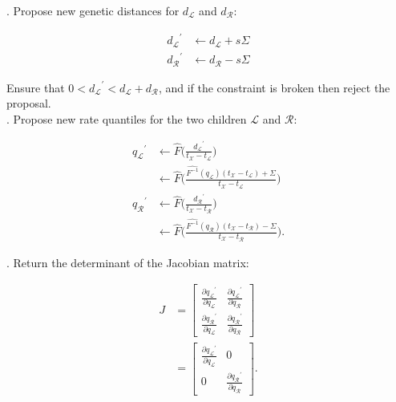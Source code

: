 \documentclass[12pt]{article}
\begin{document}
. Propose new genetic distances for $d_\mathcal{L}$ and $d_\mathcal{R}$:

\begin{align}
	{d_\mathcal{L}}^\prime & \leftarrow d_\mathcal{L} + s\Sigma \\
	{d_\mathcal{R}}^\prime & \leftarrow d_\mathcal{R} - s\Sigma
\end{align}


Ensure that $0 < {d_\mathcal{L}}^\prime < d_\mathcal{L} + d_\mathcal{R}$, and if the constraint is broken then reject the proposal.  \\




. Propose new rate quantiles for the two children $\mathcal{L}$ and $\mathcal{R}$:


\begin{align}
	{q_\mathcal{L}}^\prime &\leftarrow \hat{F}\Big( \frac{{d_\mathcal{L}}^\prime}{t_\mathcal{X} - t_\mathcal{L}} \big) \nonumber\\
				 &\leftarrow \hat{F}\Big( \frac{\hat{F^{-1}} (q_\mathcal{L}) (t_\mathcal{X} - t_\mathcal{L}) + \Sigma}{t_\mathcal{X} - t_\mathcal{L}} \big) \\
	{q_\mathcal{R}}^\prime &\leftarrow \hat{F}\Big( \frac{{d_\mathcal{R}}^\prime}{t_\mathcal{X} - t_\mathcal{R}} \big) \nonumber \\
				 &\leftarrow \hat{F}\Big( \frac{\hat{F^{-1}} (q_\mathcal{R}) (t_\mathcal{X} - t_\mathcal{R}) - \Sigma}{t_\mathcal{X} - t_\mathcal{R}} \big).
\end{align}



. Return the determinant of the Jacobian matrix:


\begin{align}
	J &= \begin{bmatrix} \frac{\partial {q_\mathcal{L}}^\prime}{\partial q_\mathcal{L}} & \frac{\partial {q_\mathcal{L}}^\prime}{\partial q_\mathcal{R}} \\
						 \frac{\partial {q_\mathcal{R}}^\prime}{\partial q_\mathcal{L}} & \frac{\partial {q_\mathcal{R}}^\prime}{\partial q_\mathcal{R}} \end{bmatrix} \nonumber \\
	 &= \begin{bmatrix} \frac{\partial {q_\mathcal{L}}^\prime}{\partial q_\mathcal{L}} & 0 \\
						 0 & \frac{\partial {q_\mathcal{R}}^\prime}{\partial q_\mathcal{R}} \end{bmatrix}.
\end{align}
\end{document}
